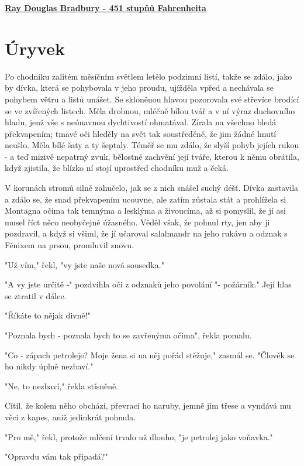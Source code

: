\documentclass[11pt]{article}
\begin{document}
    \begin{center}
        \underline{\textbf{\huge Ray Douglas Bradbury - 451 stupňů Fahrenheita}}
    \end{center}
    \section*{Úryvek}
    Po chodníku zalitém měsíčním světlem letělo podzimní listí, takže se zdálo, jako by dívka, která se pohybovala v jeho proudu, ujížděla vpřed a nechávala se pohybem větru a listů unášet. Se skloněnou hlavou pozorovala své střevíce brodící se ve zvířených listech. Měla drobnou, mléčně bílou tvář a v ní výraz duchovního hladu, jenž vše s neúnavnou dychtivostí ohmatával. Zírala na všechno bledá překvapením; tmavé oči hleděly na svět tak soustředěně, že jim žádné hnutí neušlo. Měla bílé šaty a ty šeptaly. Téměř se mu zdálo, že slyší pohyb jejích rukou - a teď mizivě nepatrný zvuk, bělostné zachvění její tváře, kterou k němu obrátila, když zjistila, že blízko ní stojí uprostřed chodníku muž a čeká.
    
    V korunách stromů silně zahučelo, jak se z nich snášel suchý déšť. Dívka zastavila a zdálo se, že snad překvapením ucouvne, ale zatím zůstala stát a prohlížela si Montagna očima tak temnýma a lesklýma a živoucíma, až si pomyslil, že jí asi musel říct něco neobyčejně úžasného. Věděl však, že pohnul rty, jen aby ji pozdravil, a když si všiml, že jí učaroval salalmandr na jeho rukávu a odznak s Fénixem na prsou, promluvil znovu.
    
    "Už vím," řekl, "vy jste naše nová sousedka."
    
    "A vy jste určitě -" pozdvihla oči z odznaků jeho povolání "- požárník." Její hlas se ztratil v dálce.
    
    "Říkáte to nějak divně!"
    
    "Poznala bych - poznala bych to se zavřenýma očima", řekla pomalu.
    
    "Co - zápach petroleje? Moje žena si na něj pořád stěžuje," zasmál se. "Člověk se ho nikdy úplně nezbaví."
    
    "Ne, to nezbaví," řekla stísněně.
    
    Cítil, že kolem něho obchází, převrací ho naruby, jemně jím třese a vyndává mu věci z kapes, aniž jedinkrát pohnula.
    
    "Pro mě," řekl, protože mlčení trvalo už dlouho, "je petrolej jako voňavka."
    
    "Opravdu vám tak připadá?"
    
\end{document}
